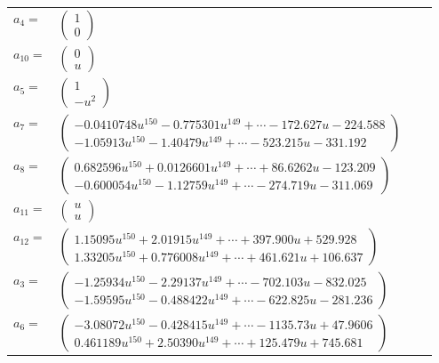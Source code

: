 \documentclass[1p]{elsarticle_modified}
\theoremstyle{definition}
\begin{document}
\begin{tabular}{m{7pt} m{180pt} m{7pt} m{180pt} }
\flushright $a_{4}=$&$\begin{pmatrix}1\\0\end{pmatrix}$ \\
\flushright $a_{10}=$&$\begin{pmatrix}0\\u\end{pmatrix}$ \\
\flushright $a_{5}=$&$\begin{pmatrix}1\\- u^2\end{pmatrix}$ \\
\flushright $a_{7}=$&$\begin{pmatrix}-0.0410748 u^{150}-0.775301 u^{149}+\cdots-172.627 u-224.588\\-1.05913 u^{150}-1.40479 u^{149}+\cdots-523.215 u-331.192\end{pmatrix}$ \\
\flushright $a_{8}=$&$\begin{pmatrix}0.682596 u^{150}+0.0126601 u^{149}+\cdots+86.6262 u-123.209\\-0.600054 u^{150}-1.12759 u^{149}+\cdots-274.719 u-311.069\end{pmatrix}$ \\
\flushright $a_{11}=$&$\begin{pmatrix}u\\u\end{pmatrix}$ \\
\flushright $a_{12}=$&$\begin{pmatrix}1.15095 u^{150}+2.01915 u^{149}+\cdots+397.900 u+529.928\\1.33205 u^{150}+0.776008 u^{149}+\cdots+461.621 u+106.637\end{pmatrix}$ \\
\flushright $a_{3}=$&$\begin{pmatrix}-1.25934 u^{150}-2.29137 u^{149}+\cdots-702.103 u-832.025\\-1.59595 u^{150}-0.488422 u^{149}+\cdots-622.825 u-281.236\end{pmatrix}$ \\
\flushright $a_{6}=$&$\begin{pmatrix}-3.08072 u^{150}-0.428415 u^{149}+\cdots-1135.73 u+47.9606\\0.461189 u^{150}+2.50390 u^{149}+\cdots+125.479 u+745.681\end{pmatrix}$ \\

\end{tabular}
\end{document}
